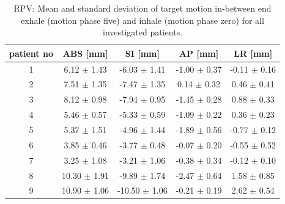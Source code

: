 \documentclass[type=dr, dr=rernat, accentcolor=tud7b,colorbacktitle, bigchapter, openright, twoside, 12pt ]{tudthesis}
\begin{document}
\begin{table}[htbp]
  \centering
  \caption{RPV: Mean and standard deviation of target motion in-between end exhale (motion phase five) and inhale (motion phase zero) for all 
  investigated patients.}
  \begin{tabular}{|c|c|c|c|c|}
    \hline\hline
    patient no\rule{0pt}{2.6ex}\rule[-1.2ex]{0pt}{0pt} & ABS [mm] & SI [mm] & AP [mm] & LR [mm]\\
    \hline
    1 & 6.12 $\pm$ 1.43 & -6.03 $\pm$ 1.41 & -1.00 $\pm$ 0.37 & -0.11 $\pm$ 0.16 \\
    2 & 7.51 $\pm$ 1.35 & -7.47 $\pm$ 1.35 & 0.14 $\pm$ 0.32 & 0.46 $\pm$ 0.41 \\
    3 & 8.12 $\pm$ 0.98 & -7.94 $\pm$ 0.95 & -1.45 $\pm$ 0.28 & 0.88 $\pm$ 0.33 \\
    4 & 5.46 $\pm$ 0.57 & -5.33 $\pm$ 0.59 & -1.09 $\pm$ 0.22 & 0.36 $\pm$ 0.23 \\
    5 & 5.37 $\pm$ 1.51 & -4.96 $\pm$ 1.44 & -1.89 $\pm$ 0.56 & -0.77 $\pm$ 0.12 \\
    6 & 3.85 $\pm$ 0.46 & -3.77 $\pm$ 0.48 & -0.07 $\pm$ 0.20 & -0.55 $\pm$ 0.52 \\
    7 & 3.25 $\pm$ 1.08 & -3.21 $\pm$ 1.06 & -0.38 $\pm$ 0.34 & -0.12 $\pm$ 0.10 \\
    8 & 10.30 $\pm$ 1.91 & -9.89 $\pm$ 1.74 & -2.47 $\pm$ 0.64 & 1.58 $\pm$ 0.85 \\
    9 & 10.90 $\pm$ 1.06 & -10.50 $\pm$ 1.06 & -0.21 $\pm$ 0.19 & 2.62 $\pm$ 0.54 \\
    \hline\hline
  \end{tabular}
  \label{tab:motion:RPV:mdacc}
\end{table}

\vspace*{-0.5cm}
\end{document}

